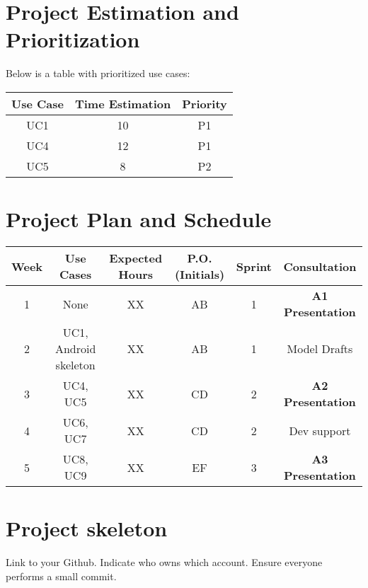 \documentclass{article}
\begin{document}
\section{Project Estimation and Prioritization}

Below is a table with prioritized use cases:

\begin{table}[h]
  \centering
  \begin{tabular}{|c|c|c|}
    \hline
    Use Case & Time Estimation & Priority \\ \hline
    UC1      & 10             & P1       \\ \hline
    UC4      & 12             & P1       \\ \hline
    UC5      & 8              & P2       \\ \hline
  \end{tabular}
\end{table}

\section{Project Plan and Schedule}

\begin{longtable}{|c|c|c|c|c|c|}
    \hline
    \textbf{Week} & \textbf{Use Cases} & \textbf{Expected Hours} & \textbf{P.O. (Initials)} & \textbf{Sprint} & \textbf{Consultation}\\
    \hline
    1 & None & XX & AB & 1 & \textbf{A1 Presentation}\\
    \hline
    2 & UC1, Android skeleton & XX & AB & 1 & Model Drafts\\
    \hline
    3 & UC4, UC5 & XX & CD & 2 & \textbf{A2 Presentation}\\
    \hline
    4 & UC6, UC7 & XX & CD & 2 & Dev support\\
    \hline
    5 & UC8, UC9 & XX & EF & 3 & \textbf{A3 Presentation}\\
    \hline
\end{longtable}

\section{Project skeleton}
Link to your Github. Indicate who owns which account.  
Ensure everyone performs a small commit.
\end{document}
